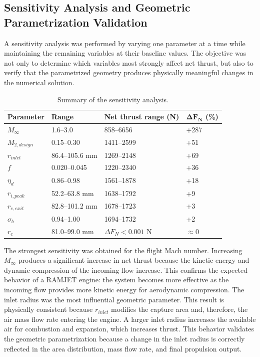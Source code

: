 \documentclass[preprint,12pt]{elsarticle}
\begin{document}
\subsection{Sensitivity Analysis and Geometric Parametrization Validation}
A sensitivity analysis was performed by varying one parameter at a time while maintaining the remaining variables at their baseline values. The objective was not only to determine which variables most strongly affect net thrust, but also to verify that the parametrized geometry produces physically meaningful changes in the numerical solution.
\begin{table}[H]
\centering
\caption{Summary of the sensitivity analysis.}
\label{tab:sensitivity_summary}
\begin{tabular}{llll}
\toprule
\textbf{Parameter} & \textbf{Range} & \textbf{Net thrust range (N)} & $\boldsymbol{\Delta F_N}$ \textbf{(\%)} \\
\midrule
$M_\infty$ & 1.6--3.0 & 858--6656 & +287 \\
$M_{2,design}$ & 0.15--0.30 & 1411--2599 & +51 \\
$r_{inlet}$ & 86.4--105.6 mm & 1269--2148 & +69 \\
$f$ & 0.020--0.045 & 1220--2340 & +36 \\
$\eta_d$ & 0.86--0.98 & 1561--1878 & +18 \\
$r_{i,peak}$ & 52.2--63.8 mm & 1638--1792 & +9 \\
$r_{e,exit}$ & 82.8--101.2 mm & 1678--1723 & +3 \\
$\sigma_b$ & 0.94--1.00 & 1694--1732 & +2 \\
$r_c$ & 81.0--99.0 mm & $\Delta F_N<0.001$ N & $\approx 0$ \\
\bottomrule
\end{tabular}
\end{table}
The strongest sensitivity was obtained for the flight Mach number. Increasing $M_\infty$ produces a significant increase in net thrust because the kinetic energy and dynamic compression of the incoming flow increase. This confirms the expected behavior of a RAMJET engine: the system becomes more effective as the incoming flow provides more kinetic energy for aerodynamic compression.
The inlet radius was the most influential geometric parameter. This result is physically consistent because $r_{inlet}$ modifies the capture area and, therefore, the air mass flow rate entering the engine. A larger inlet radius increases the available air for combustion and expansion, which increases thrust. This behavior validates the geometric parametrization because a change in the inlet radius is correctly reflected in the area distribution, mass flow rate, and final propulsion output.
\end{document}
